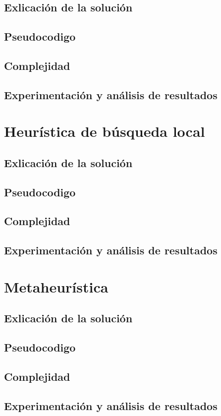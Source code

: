 \documentclass[spanish,12pt]{article}
\begin{document}
\subsection{Exlicación de la solución}

\subsection{Pseudocodigo}

\subsection{Complejidad}

\subsection{Experimentación y análisis de resultados}




\section{Heurística de búsqueda local}

\subsection{Exlicación de la solución}

\subsection{Pseudocodigo}

\subsection{Complejidad}

\subsection{Experimentación y análisis de resultados}



\section{Metaheurística}

\subsection{Exlicación de la solución}

\subsection{Pseudocodigo}

\subsection{Complejidad}

\subsection{Experimentación y análisis de resultados}
\end{document}
